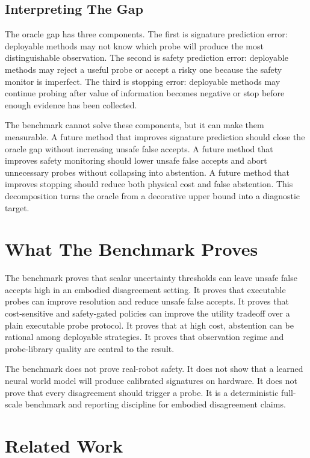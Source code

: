 \documentclass{article}
\begin{document}
\subsection{Interpreting The Gap}

The oracle gap has three components. The first is signature prediction error: deployable methods may not know which probe will produce the most distinguishable observation. The second is safety prediction error: deployable methods may reject a useful probe or accept a risky one because the safety monitor is imperfect. The third is stopping error: deployable methods may continue probing after value of information becomes negative or stop before enough evidence has been collected.

The benchmark cannot solve these components, but it can make them measurable. A future method that improves signature prediction should close the oracle gap without increasing unsafe false accepts. A future method that improves safety monitoring should lower unsafe false accepts and abort unnecessary probes without collapsing into abstention. A future method that improves stopping should reduce both physical cost and false abstention. This decomposition turns the oracle from a decorative upper bound into a diagnostic target.

\section{What The Benchmark Proves}

The benchmark proves that scalar uncertainty thresholds can leave unsafe false accepts high in an embodied disagreement setting. It proves that executable probes can improve resolution and reduce unsafe false accepts. It proves that cost-sensitive and safety-gated policies can improve the utility tradeoff over a plain executable probe protocol. It proves that at high cost, abstention can be rational among deployable strategies. It proves that observation regime and probe-library quality are central to the result.

The benchmark does not prove real-robot safety. It does not show that a learned neural world model will produce calibrated signatures on hardware. It does not prove that every disagreement should trigger a probe. It is a deterministic full-scale benchmark and reporting discipline for embodied disagreement claims.

\section{Related Work}
\end{document}
